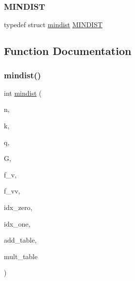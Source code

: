 \subsubsection{\texorpdfstring{M\+I\+N\+D\+I\+ST}{MINDIST}}
{\footnotesize\ttfamily typedef struct \mbox{\hyperlink{structmindist}{mindist}} \mbox{\hyperlink{mindist_8_c_a4bd5b989fb66bfdc88d228601d74aee7}{M\+I\+N\+D\+I\+ST}}}



\subsection{Function Documentation}
\mbox{\label{mindist_8_c_afcf4627b68150e9a146e7cacdabb2b26}} 
\subsubsection{\texorpdfstring{mindist()}{mindist()}}
{\footnotesize\ttfamily int \mbox{\hyperlink{structmindist}{mindist}} (\begin{DoxyParamCaption}\item[{int}]{n,  }\item[{int}]{k,  }\item[{int}]{q,  }\item[{int $\ast$}]{G,  }\item[{int}]{f\+\_\+v,  }\item[{int}]{f\+\_\+vv,  }\item[{int}]{idx\+\_\+zero,  }\item[{int}]{idx\+\_\+one,  }\item[{\mbox{\hyperlink{galois_8h_a09fddde158a3a20bd2dcadb609de11dc}{I\+NT}} $\ast$}]{add\+\_\+table,  }\item[{\mbox{\hyperlink{galois_8h_a09fddde158a3a20bd2dcadb609de11dc}{I\+NT}} $\ast$}]{mult\+\_\+table }\end{DoxyParamCaption})}

